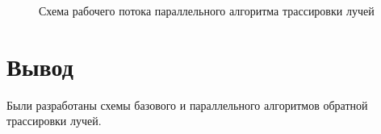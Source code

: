\begin{figure}[h!]
	
	
	\caption{Схема рабочего потока параллельного алгоритма трассировки лучей}
	
	\label{fig:trass_count}
	
\end{figure}



\section*{Вывод}

Были разработаны схемы базового и параллельного алгоритмов обратной трассировки лучей.


